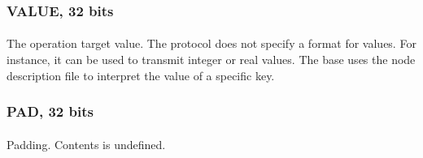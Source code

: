 \documentclass[a4paper, 11pt]{article}
\begin{document}
\subsubsection{VALUE, 32 bits}
\paragraph{}
The operation target value. The protocol does not specify a format for
values. For instance, it can be used to transmit integer or real values.
The base uses the node description file to interpret the value of a
specific key.

\subsubsection{PAD, 32 bits}
\paragraph{}
Padding. Contents is undefined.
\end{document}
